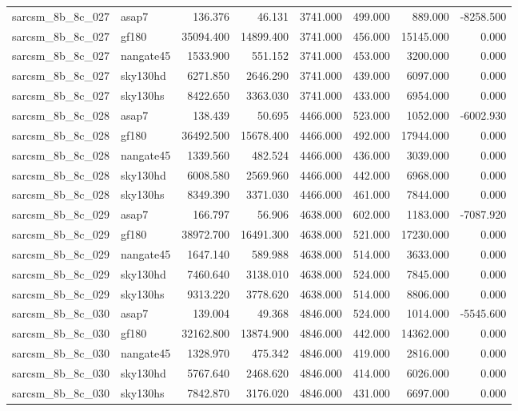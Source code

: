 \begin{tabular}{llrrrrrr}
sarcsm\_8b\_8c\_027 & asap7 & 136.376 & 46.131 & 3741.000 & 499.000 & 889.000 & -8258.500 \\
sarcsm\_8b\_8c\_027 & gf180 & 35094.400 & 14899.400 & 3741.000 & 456.000 & 15145.000 & 0.000 \\
sarcsm\_8b\_8c\_027 & nangate45 & 1533.900 & 551.152 & 3741.000 & 453.000 & 3200.000 & 0.000 \\
sarcsm\_8b\_8c\_027 & sky130hd & 6271.850 & 2646.290 & 3741.000 & 439.000 & 6097.000 & 0.000 \\
sarcsm\_8b\_8c\_027 & sky130hs & 8422.650 & 3363.030 & 3741.000 & 433.000 & 6954.000 & 0.000 \\
sarcsm\_8b\_8c\_028 & asap7 & 138.439 & 50.695 & 4466.000 & 523.000 & 1052.000 & -6002.930 \\
sarcsm\_8b\_8c\_028 & gf180 & 36492.500 & 15678.400 & 4466.000 & 492.000 & 17944.000 & 0.000 \\
sarcsm\_8b\_8c\_028 & nangate45 & 1339.560 & 482.524 & 4466.000 & 436.000 & 3039.000 & 0.000 \\
sarcsm\_8b\_8c\_028 & sky130hd & 6008.580 & 2569.960 & 4466.000 & 442.000 & 6968.000 & 0.000 \\
sarcsm\_8b\_8c\_028 & sky130hs & 8349.390 & 3371.030 & 4466.000 & 461.000 & 7844.000 & 0.000 \\
sarcsm\_8b\_8c\_029 & asap7 & 166.797 & 56.906 & 4638.000 & 602.000 & 1183.000 & -7087.920 \\
sarcsm\_8b\_8c\_029 & gf180 & 38972.700 & 16491.300 & 4638.000 & 521.000 & 17230.000 & 0.000 \\
sarcsm\_8b\_8c\_029 & nangate45 & 1647.140 & 589.988 & 4638.000 & 514.000 & 3633.000 & 0.000 \\
sarcsm\_8b\_8c\_029 & sky130hd & 7460.640 & 3138.010 & 4638.000 & 524.000 & 7845.000 & 0.000 \\
sarcsm\_8b\_8c\_029 & sky130hs & 9313.220 & 3778.620 & 4638.000 & 514.000 & 8806.000 & 0.000 \\
sarcsm\_8b\_8c\_030 & asap7 & 139.004 & 49.368 & 4846.000 & 524.000 & 1014.000 & -5545.600 \\
sarcsm\_8b\_8c\_030 & gf180 & 32162.800 & 13874.900 & 4846.000 & 442.000 & 14362.000 & 0.000 \\
sarcsm\_8b\_8c\_030 & nangate45 & 1328.970 & 475.342 & 4846.000 & 419.000 & 2816.000 & 0.000 \\
sarcsm\_8b\_8c\_030 & sky130hd & 5767.640 & 2468.620 & 4846.000 & 414.000 & 6026.000 & 0.000 \\
sarcsm\_8b\_8c\_030 & sky130hs & 7842.870 & 3176.020 & 4846.000 & 431.000 & 6697.000 & 0.000 \\

\end{tabular}
